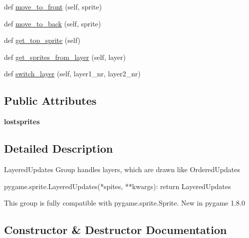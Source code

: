 \begin{DoxyCompactItemize}
\item 
def \hyperlink{classpygame_1_1sprite_1_1_layered_updates_a452915ddad3c4fea5b0bc6beaf0eba87}{move\+\_\+to\+\_\+front} (self, sprite)
\item 
def \hyperlink{classpygame_1_1sprite_1_1_layered_updates_a6c1655db5c38ff9ca1f5dc1b27f9f1d5}{move\+\_\+to\+\_\+back} (self, sprite)
\item 
def \hyperlink{classpygame_1_1sprite_1_1_layered_updates_ab9fbda5abb958feddcad849b76d5f2e4}{get\+\_\+top\+\_\+sprite} (self)
\item 
def \hyperlink{classpygame_1_1sprite_1_1_layered_updates_ae9b67ca3a02b00f64c4efd5a708d9c19}{get\+\_\+sprites\+\_\+from\+\_\+layer} (self, layer)
\item 
def \hyperlink{classpygame_1_1sprite_1_1_layered_updates_a62b4dec222019c47c925401f71ea733b}{switch\+\_\+layer} (self, layer1\+\_\+nr, layer2\+\_\+nr)
\end{DoxyCompactItemize}
\subsection*{Public Attributes}
\begin{DoxyCompactItemize}
\item 
\mbox{\label{classpygame_1_1sprite_1_1_layered_updates_a461a9ab40f56b47298a82e07c9fa3414}} 
{\bfseries lostsprites}
\end{DoxyCompactItemize}


\subsection{Detailed Description}
\begin{DoxyVerb}LayeredUpdates Group handles layers, which are drawn like OrderedUpdates

pygame.sprite.LayeredUpdates(*spites, **kwargs): return LayeredUpdates

This group is fully compatible with pygame.sprite.Sprite.
New in pygame 1.8.0\end{DoxyVerb}
 

\subsection{Constructor \& Destructor Documentation}
\mbox{\label{classpygame_1_1sprite_1_1_layered_updates_aa398d6d3b6903d8a5a47b756fb9172e1}} 

